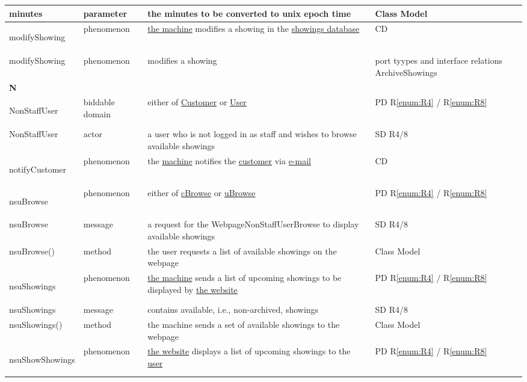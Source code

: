 \documentclass[a4paper,10pt,titlepage,bibtotoc,bibtotocnumbered]{scrreprt}
\begin{document}
\begin{longtable}{|p{.4\linewidth}|p{.2\linewidth}|p{.2\linewidth}|p{.2\linewidth}|}
\hline
minutes & parameter & the minutes to be converted to unix epoch time & Class Model\\
\hline
\hypertarget{glossary:modifyShowing}{modifyShowing} & phenomenon & \hyperlink{glossary:UDEKino}{the machine} modifies a showing in the \hyperlink{glossary:Showing}{showings database} & CD\\
\hline
modifyShowing & phenomenon & modifies a showing & port tyypes and interface relations ArchiveShowings\\
\hline
\multicolumn{4}{|l|}{\textbf{N}}\\
\hline
\hypertarget{glossary:NonStaffUser}{NonStaffUser} & biddable domain & either of \hyperlink{glossary:Customer}{Customer} or \hyperlink{glossary:User}{User} & PD R\ref{enum:R4} / R\ref{enum:R8}\\
\hline
NonStaffUser & actor & a user who is not logged in as staff and wishes to browse available showings & SD R4/8\\
\hline
\hypertarget{glossary:notifyCustomer}{notifyCustomer} & phenomenon & the \hyperlink{glossary:UDEKino}{machine} notifies the \hyperlink{glossary:Customer}{customer} via \hyperlink{glossary:Email}{e-mail} & CD\\
\hline
\hypertarget{glossary:nsuBrowse}{nsuBrowse} & phenomenon & either of \hyperlink{glossary:cBrowse}{cBrowse} or \hyperlink{glossary:uBrowse}{uBrowse} & PD R\ref{enum:R4} / R\ref{enum:R8}\\
\hline
nsuBrowse & message & a request for the WebpageNonStaffUserBrowse to display available showings & SD R4/8\\
\hline
nsuBrowse() & method & the user requests a list of available showings on the webpage & Class Model\\
\hline
\hypertarget{glossary:nsuShowings}{nsuShowings} & phenomenon & \hyperlink{glossary:UDEK-NonStaffUserBrowse}{the machine} sends a list of upcoming showings to be displayed by \hyperlink{glossary:WebPageNonStaffUserBrowse}{the website} & PD R\ref{enum:R4} / R\ref{enum:R8}\\
\hline
nsuShowings & message & contains available, i.e., non-archived, showings & SD R4/8\\
\hline
nsuShowings() & method & the machine sends a set of available showings to the webpage & Class Model\\
\hline
\hypertarget{glossary:nsuShowShowings}{nsuShowShowings} & phenomenon & \hyperlink{glossary:WebPageNonStaffUserBrowse}{the website} displays a list of upcoming showings to the \hyperlink{glossary:NonStaffUser}{user} & PD R\ref{enum:R4} / R\ref{enum:R8}\\

\end{longtable}
\end{document}
